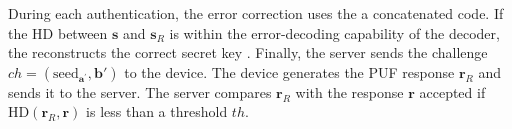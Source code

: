 \DIFaddend During each authentication, the error correction uses the \DIFdelbegin {}\DIFdelend \DIFaddbegin {}\DIFaddend a concatenated code. 
\DIFdelbegin {}\DIFdelend If the HD between $\mathbf{s}$ and $\mathbf{s}_R$ is within the error-decoding capability of the \DIFdelbegin {}\DIFdelend \DIFaddbegin {}\DIFaddend decoder, the \DIFdelbegin {}\DIFdelend \DIFaddbegin {}\DIFaddend reconstructs the correct secret key \DIFdelbegin {}\DIFdelend \DIFaddbegin {}\DIFaddend . 
Finally, the server sends the \DIFaddbegin {}\DIFaddend challenge $ch=(\text{seed}_{\mathbf{a}^\prime}, \mathbf{b}')$ to the device. 
The device generates the PUF response $\mathbf{r}_R$ \DIFaddbegin {}\DIFaddend and sends it to the server. 
The server compares $\mathbf{r}_R$ with the response $\mathbf{r}$ \DIFdelbegin {}\DIFdelend \DIFaddbegin {}\DIFaddend accepted if $\text{HD}(\mathbf{r}_R, \mathbf{r})$ is less than a \DIFaddbegin {}\DIFaddend threshold $th$.
